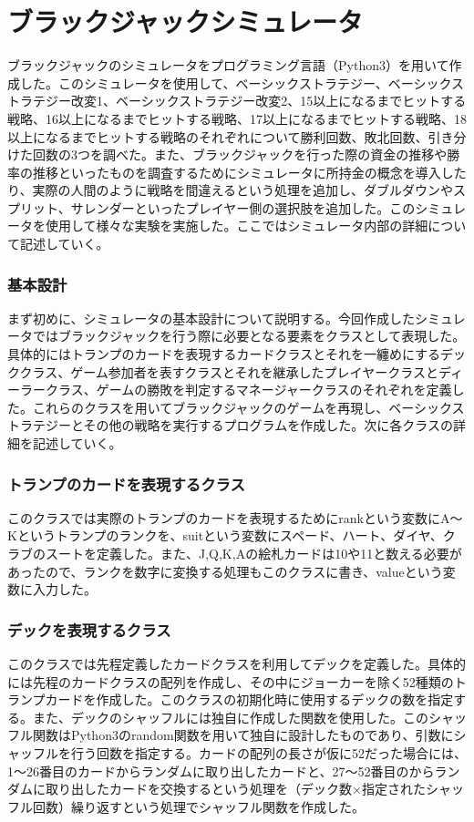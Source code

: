 \section{ブラックジャックシミュレータ}
ブラックジャックのシミュレータをプログラミング言語（Python3）を用いて作成した。このシミュレータを使用して、ベーシックストラテジー、ベーシックストラテジー改変1、ベーシックストラテジー改変2、15以上になるまでヒットする戦略、16以上になるまでヒットする戦略、17以上になるまでヒットする戦略、18以上になるまでヒットする戦略のそれぞれについて勝利回数、敗北回数、引き分けた回数の3つを調べた。また、ブラックジャックを行った際の資金の推移や勝率の推移といったものを調査するためにシミュレータに所持金の概念を導入したり、実際の人間のように戦略を間違えるという処理を追加し、ダブルダウンやスプリット、サレンダーといったプレイヤー側の選択肢を追加した。このシミュレータを使用して様々な実験を実施した。ここではシミュレータ内部の詳細について記述していく。

\subsubsection{基本設計}
まず初めに、シミュレータの基本設計について説明する。今回作成したシミュレータではブラックジャックを行う際に必要となる要素をクラスとして表現した。具体的にはトランプのカードを表現するカードクラスとそれを一纏めにするデッククラス、ゲーム参加者を表すクラスとそれを継承したプレイヤークラスとディーラークラス、ゲームの勝敗を判定するマネージャークラスのそれぞれを定義した。これらのクラスを用いてブラックジャックのゲームを再現し、ベーシックストラテジーとその他の戦略を実行するプログラムを作成した。次に各クラスの詳細を記述していく。

\subsubsection{トランプのカードを表現するクラス}
このクラスでは実際のトランプのカードを表現するためにrankという変数にA～Kというトランプのランクを、suitという変数にスペード、ハート、ダイヤ、クラブのスートを定義した。また、J,Q,K,Aの絵札カードは10や11と数える必要があったので、ランクを数字に変換する処理もこのクラスに書き、valueという変数に入力した。

\subsubsection{デックを表現するクラス}
このクラスでは先程定義したカードクラスを利用してデックを定義した。具体的には先程のカードクラスの配列を作成し、その中にジョーカーを除く52種類のトランプカードを作成した。このクラスの初期化時に使用するデックの数を指定する。また、デックのシャッフルには独自に作成した関数を使用した。このシャッフル関数はPython3のrandom関数を用いて独自に設計したものであり、引数にシャッフルを行う回数を指定する。カードの配列の長さが仮に52だった場合には、1～26番目のカードからランダムに取り出したカードと、27～52番目のからランダムに取り出したカードを交換するという処理を（デック数×指定されたシャッフル回数）繰り返すという処理でシャッフル関数を作成した。


